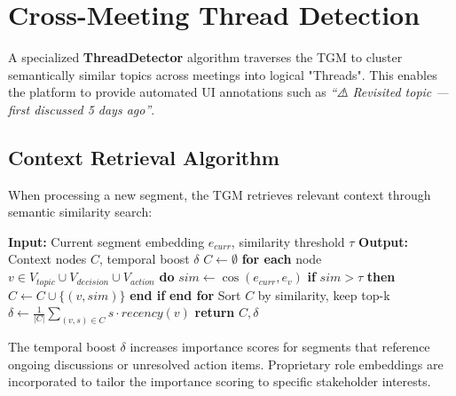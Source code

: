 \section{Cross-Meeting Thread Detection}
\noindent
A specialized \textbf{ThreadDetector} algorithm traverses the TGM to cluster semantically similar topics across meetings into logical "Threads". This enables the platform to provide automated UI annotations such as \textit{``⚠️ Revisited topic — first discussed 5 days ago''}.

\subsection{Context Retrieval Algorithm}
When processing a new segment, the TGM retrieves relevant context through semantic similarity search:
\begin{algorithm}
\caption{Temporal Context Retrieval}
\begin{algorithmic}[1]
\State \textbf{Input:} Current segment embedding $e_{curr}$, similarity threshold $\tau$
\State \textbf{Output:} Context nodes $C$, temporal boost $\delta$
\State $C \gets \emptyset$
\State \textbf{for each} node $v \in V_{topic} \cup V_{decision} \cup V_{action}$ \textbf{do}
\State \quad $sim \gets \cos(e_{curr}, e_v)$
\State \quad \textbf{if} $sim > \tau$ \textbf{then}
\State \quad \quad $C \gets C \cup \{(v, sim)\}$
\State \quad \textbf{end if}
\State \textbf{end for}
\State Sort $C$ by similarity, keep top-k
\State $\delta \gets \frac{1}{|C|} \sum_{(v,s) \in C} s \cdot recency(v)$
\State \textbf{return} $C, \delta$
\end{algorithmic}
\end{algorithm}

The temporal boost $\delta$ increases importance scores for segments that reference ongoing discussions or unresolved action items. Proprietary role embeddings are incorporated to tailor the importance scoring to specific stakeholder interests.